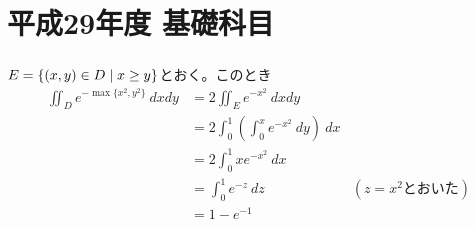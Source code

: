 \section{平成29年度 基礎科目}

\subsubsection{} %
\begin{sol}
  $E = \left\{ (x,y) \in D \mathrel{} \middle| \mathrel{} x \geq y \right\}$とおく。このとき
  \begin{align*}
    \iint_D e^{- \max \{ x^2,y^2 \} } \ dx dy &= 2 \iint_E e^{- x^2 } \ dx dy \\
    &= 2 \int_0^1 \left(  \int_0^x e^{-x^2} \ dy   \right) \ dx \\
    &= 2 \int_0^1 x e^{-x^2} \ dx \\
    &= \int_0^1 e^{-z} \ dz &(z = x^2 \text{とおいた}) \\
    &= 1 - e^{-1}
  \end{align*}
\end{sol}


\newpage



